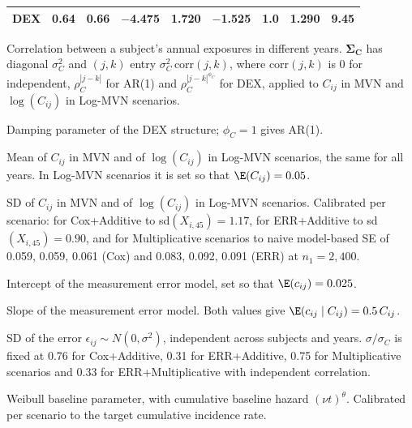 \begin{table}[!htbp]
\begin{minipage}{\textwidth}
\begin{tabular}{|l|c|c|c|c|c|c|c|c|}
DEX & 0.64 & 0.66 & $-$4.475 & 1.720 & $-$1.525 & 1.0 & 1.290 & 9.45 \\
\hline
\end{tabular}
\par
{\raggedright\footnotesize
\begin{list}{}{\setlength{\leftmargin}{1.2em}\setlength{\labelwidth}{0.8em}\setlength{\labelsep}{0.4em}%
  \setlength{\itemsep}{0pt}\setlength{\parsep}{0pt}\setlength{\topsep}{4pt}\setlength{\partopsep}{0pt}}
\item[\textsuperscript{\textit{a}}] Correlation between a subject's annual exposures in different years. $\bm{\Sigma_C}$ has diagonal $\sigma_C^2$ and $(j,k)$ entry $\sigma_C^2\,\text{corr}(j,k)$, where corr$(j,k)$ is 0 for independent, $\rho_C^{|j-k|}$ for AR(1) and $\rho_C^{|j-k|^{\phi_C}}$ for DEX, applied to $C_{ij}$ in MVN and $\log(C_{ij})$ in Log-MVN scenarios.
\item[\textsuperscript{\textit{b}}] Damping parameter of the DEX structure; $\phi_C=1$ gives AR(1).
\item[\textsuperscript{\textit{c}}] Mean of $C_{ij}$ in MVN and of $\log(C_{ij})$ in Log-MVN scenarios, the same for all years. In Log-MVN scenarios it is set so that $\E(C_{ij})=0.05$.
\item[\textsuperscript{\textit{d}}] SD of $C_{ij}$ in MVN and of $\log(C_{ij})$ in Log-MVN scenarios. Calibrated per scenario: for Cox+Additive to sd$(X_{i,45})=1.17$, for ERR+Additive to sd$(X_{i,45})=0.90$, and for Multiplicative scenarios to naive model-based SE of 0.059, 0.059, 0.061 (Cox) and 0.083, 0.092, 0.091 (ERR) at $n_1=2,400$.
\item[\textsuperscript{\textit{e}}] Intercept of the measurement error model, set so that $\E(c_{ij})=0.025$.
\item[\textsuperscript{\textit{f}}] Slope of the measurement error model. Both values give $\E(c_{ij}\mid C_{ij})=0.5\,C_{ij}$.
\item[\textsuperscript{\textit{g}}] SD of the error $\epsilon_{ij}\sim N(0,\sigma^2)$, independent across subjects and years. $\sigma/\sigma_C$ is fixed at 0.76 for Cox+Additive, 0.31 for ERR+Additive, 0.75 for Multiplicative scenarios and 0.33 for ERR+Multiplicative with independent correlation.
\item[\textsuperscript{\textit{h}}] Weibull baseline parameter, with cumulative baseline hazard $(\nu t)^{\theta}$. Calibrated per scenario to the target cumulative incidence rate.
\end{list}
\par}
\end{minipage}
\label{tab:sim1_settings_cell}
\end{table}

